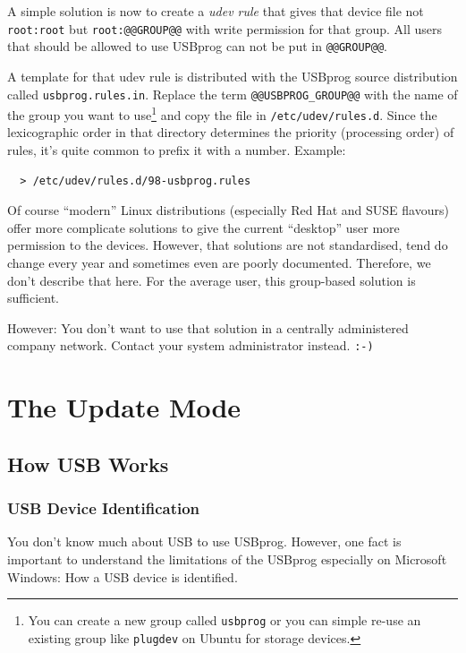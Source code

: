 \documentclass[bibtotoc,UKenglish,halfparskip,oneside,DIV12]{scrreprt}
\begin{document}
A simple solution is now to create a \emph{udev rule} that gives that device file not
\texttt{root:root} but \texttt{root:@@GROUP@@} with write permission for that group. All users that
should be allowed to use USBprog can not be put in \texttt{@@GROUP@@}.

A template for that udev rule is distributed with the USBprog source distribution called
\texttt{usbprog.rules.in}.  Replace the term \texttt{@@USBPROG\_GROUP@@} with the name of the group
you want to use\footnote{You can create a new group called \texttt{usbprog} or you can simple re-use
an existing group like \texttt{plugdev} on Ubuntu for storage devices.} and copy the file in
\texttt{/etc/udev/rules.d}.  Since the lexicographic order in that directory determines the priority
(processing order) of rules, it's quite common to prefix it with a number. Example:

\begin{lstlisting}[style=inline]
% sed -e 's/@@USBPROG_GROUP@@/plugdev/g' usbprog.rules.in \
  > /etc/udev/rules.d/98-usbprog.rules
\end{lstlisting}

Of course ``modern'' Linux distributions (especially Red Hat and SUSE flavours) offer more
complicate solutions to give the current ``desktop'' user more permission to the devices. However,
that solutions are not standardised, tend do change every year and sometimes even are poorly
documented. Therefore, we don't describe that here. For the average user, this group-based solution
is sufficient.

However: You don't want to use that solution in a centrally administered company network. Contact
your system administrator instead. \texttt{:-)}

\section{The Update Mode}

\subsection{How USB Works}

\subsubsection{USB Device Identification}

You don't know much about USB to use USBprog. However, one fact is important to understand the
limitations of the USBprog especially on Microsoft Windows: How a USB device is identified.
\end{document}
